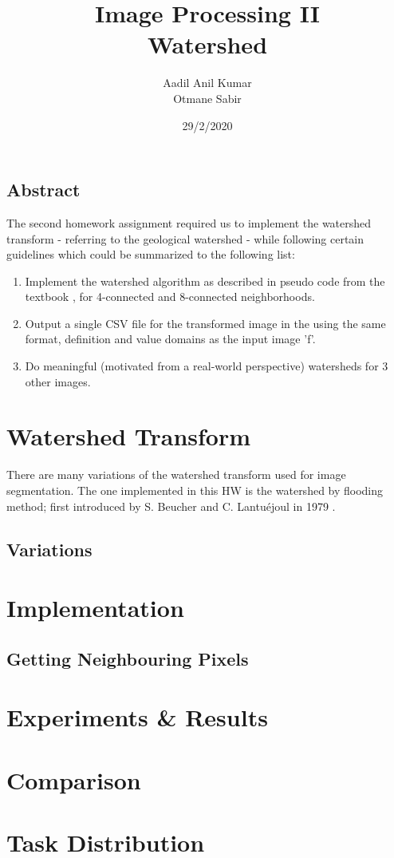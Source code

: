 \documentclass{article}
\begin{document}
\title{Image Processing II\\
 Watershed}
\author{Aadil Anil Kumar \\
Otmane Sabir
}
\date{29/2/2020}
\maketitle
\vspace{10mm}
\begin{center}
\section*{Abstract}
\large
The second homework assignment required us to implement the watershed transform - referring to the geological watershed - while following certain guidelines which could be summarized to the following list: 
\vspace{7mm}
\begin{enumerate}
    \item Implement the watershed algorithm as described in pseudo code from the textbook \cite{soille2013morphological}, for 4-connected and 8-connected neighborhoods.
    \item Output a single CSV file for the transformed image in the using the same format, definition and value domains as the input image 'f'.
    \item Do meaningful (motivated from a real-world perspective) watersheds for 3 other images.
\end{enumerate}
\end{center}
\newpage

\tableofcontents

\newpage

\section{Watershed Transform}

There are many variations of the watershed transform used for image segmentation. The one implemented in this  HW is the watershed by flooding method; first introduced by S. Beucher and C. Lantuéjoul in 1979 \cite{beucher1979international}.

\subsection{Variations}

\section{Implementation}

\subsection{Getting Neighbouring Pixels}


\section{Experiments \& Results}


\section{Comparison}


\section{Task Distribution}

\newpage
\nocite{*}
\printbibliography
\end{document}
